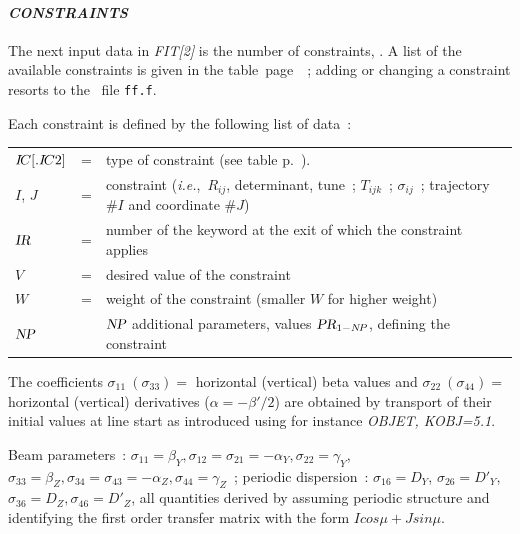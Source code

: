 \paragraph{\textit{CONSTRAINTS}}  

\noindent The next input data in \textsl{FIT[2]} is the number of constraints, \textsl{\NC}. 
A list of the available constraints is given in the table~page~\pageref{TabFITZlst1}~; adding or changing a constraint 
resorts to the \FORTRAN\ file \texttt{ff.f}. 

\medskip 

Each constraint is defined by the following list of data~: 

\begin{center}
	\begin{tabular}{lcp{15cm}}
	$I\!C[.I\!C 2]$        &  = &  type of  constraint (see table p.~\pageref{TabFITZlst1}).\\
	$I$, $J$    & =  &  constraint (\emph{i.e.},~$R_{ij}$, determinant, tune~; 
	                    $T_{ijk}$~; $\sigma_{ ij}$~; trajectory $\#I$ and coordinate $\#J$)\\
	\label{RefIR}
        $\textsl{IR}$       &  =  &  number of the keyword at the exit of which the constraint applies   \\
	$V$        &  =  &  desired value of the constraint\\
	$W$        &  =  &  weight of the constraint (smaller $W$ for higher weight)  \\
        $\textsl{NP}$       &    &   $\textsl{NP}$ additional parameters, values $\textsl{PR}_{1 - N\!P}$, defining the constraint  
	\end{tabular}
\end{center}



 The coefficients 
$ \sigma_{11}~(\sigma_{ 33}) = $ horizontal (vertical) beta values and 
$ \sigma_{ 22}~(\sigma_{ 44}) = $ horizontal (vertical) derivatives ($\alpha = -\beta'/2$) 
are obtained by transport of their initial values at line start as introduced using for instance  
\textsl{OBJET, KOBJ=5.1}.

\smallskip

 Beam parameters~: $\sigma_{11}=\beta_Y, \sigma_{12}=\sigma_{21}=-\alpha_Y, 
\sigma_{22}=\gamma_Y$, $\sigma_{33}=\beta_Z, \sigma_{34}=\sigma_{43}=-\alpha_Z, \sigma_{44}=\gamma_Z$~; periodic dispersion~: 
$\sigma_{16}=D_Y$, $\sigma_{26}=D'_Y$,  $\sigma_{36}=D_Z, \sigma_{46}=D'_Z$, all quantities derived by assuming 
 periodic structure and identifying the first order transfer matrix 
with the form   $I cos \mu + J sin \mu $. 

